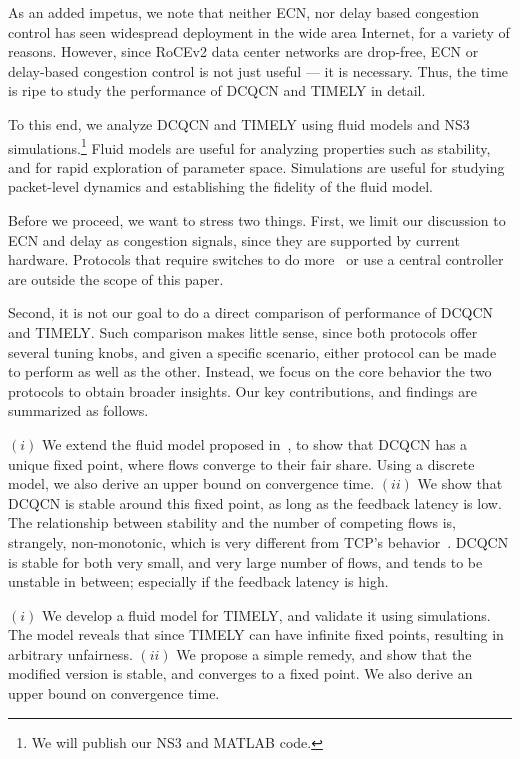 As an added impetus, we note that neither ECN, nor delay based congestion
control has seen widespread deployment in the wide area Internet, for a variety
of reasons.  However, since RoCEv2 data center networks are drop-free, ECN or
delay-based congestion control is not just useful --- it is necessary. Thus, the
time is ripe to study the performance of DCQCN and TIMELY in detail.


To this end, we analyze DCQCN and TIMELY using fluid models and NS3~\cite{NS3}
simulations.\footnote{We will publish our NS3 and MATLAB code.} Fluid models are
useful for analyzing properties such as stability, and for rapid exploration of
parameter space.  Simulations are useful for studying packet-level dynamics and
establishing the fidelity of the fluid model. 


Before we proceed, we want to stress two things.  First, we limit our discussion
to ECN and delay as congestion signals, since they are supported by current
hardware. Protocols that require switches to do
more~\cite{katabi2002congestion,rcp,pfabric} or use a central
controller~\cite{deadline,perry2014fastpass} are outside the scope of this
paper.

Second, it is not our goal to do a direct comparison of performance of DCQCN and
TIMELY.  Such comparison makes little sense, since both protocols offer several
tuning knobs, and given a specific scenario, either protocol can be made to
perform as well as the other. Instead, we focus on the core behavior the two
protocols to obtain broader insights.  Our key contributions, and findings are
summarized as follows.

 $(i)$ We extend the fluid model proposed in~\cite{dcqcn}, to show
that DCQCN has a unique fixed point, where flows converge to their fair share.
Using a discrete model, we also derive an upper  bound on convergence time.
$(ii)$ We show that DCQCN is stable around this fixed point, as long as the
feedback latency is low. The relationship between stability and the number of
competing flows is, strangely, non-monotonic, which is very different from TCP's
behavior~\cite{misra:TAC2002}. DCQCN is stable for both very small, and very
large number of flows, and tends to be unstable in between; especially if the
feedback latency is high.

 $(i)$ We develop a fluid model for TIMELY, and validate it using
simulations. The model reveals that since TIMELY can have infinite fixed points,
resulting in arbitrary unfairness.  $(ii)$ We propose a simple remedy, and show
that the modified version is stable, and converges to a fixed point. We also
derive an upper bound on convergence time.

